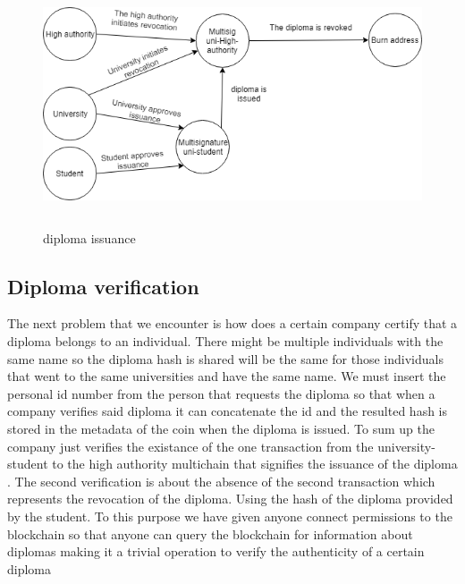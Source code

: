 \documentclass[conference]{IEEEtran}
\begin{document}
\begin{figure}[h!]
  \includegraphics[width=\linewidth]{diploma.png}
  \caption{diploma issuance }
  \begin{tabular}{r@{: }l r@{: }l}
\end{tabular}
\end{figure}

\subsection{Diploma verification}

The next problem that we encounter is how does a certain company certify that a diploma belongs to an individual. There might be multiple individuals with the same name so the diploma hash is shared  will be the same for those individuals that went to the same universities and have the same name. We must insert the personal id number from the person that requests the diploma so that when a company verifies said diploma it can concatenate the id and the resulted hash is stored in the metadata of the coin when the diploma is issued. To sum up the company just verifies the existance of the one transaction from the university-student to the high authority multichain that signifies the issuance of the diploma . The second verification is about the absence of the second transaction which represents the revocation of the diploma. Using the hash of the diploma provided by the student. To this purpose we have given anyone connect permissions to the blockchain so that anyone can query the blockchain for information about diplomas making it a trivial operation to verify the authenticity of a certain diploma
\end{document}
